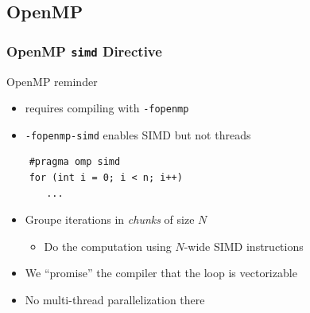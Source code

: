\documentclass[xcolor={x11names,svgnames}]{beamer}
\begin{document}
\subsection{OpenMP}


\begin{frame}[fragile=singleslide]
  \frametitle{OpenMP \texttt{simd} Directive}

  \begin{alertblock}{OpenMP reminder}
    \begin{itemize}
    \item requires compiling with \texttt{-fopenmp}
    \item \texttt{-fopenmp-simd} enables SIMD but not threads
    \end{itemize}
  \end{alertblock}
  
  \bigskip
  
  \begin{verbatim}
    #pragma omp simd
    for (int i = 0; i < n; i++)
       ...
  \end{verbatim}

  \begin{itemize}
  \item Groupe iterations in \textit{chunks} of size $N$
    \begin{itemize}
    \item Do the computation using $N$-wide SIMD instructions
    \end{itemize}
    
  \item We ``promise'' the compiler that the loop is vectorizable
  \item No multi-thread parallelization there
  \end{itemize}
\end{frame}

\end{document}
